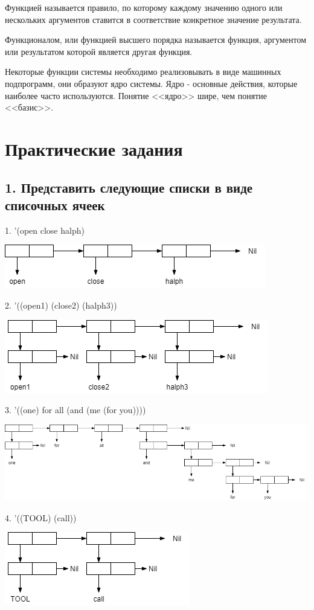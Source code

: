 \documentclass[12pt]{report}
\begin{document}
Функцией называется правило, по которому каждому значению одного или нескольких  аргументов ставится в соответствие конкретное значение результата.

Функционалом, или функцией высшего порядка называется функция, аргументом или  результатом которой является другая функция.

Некоторые функции системы необходимо реализовывать в виде машинных подпрограмм, они образуют ядро системы. Ядро - основные действия, которые наиболее часто используются. Понятие <<ядро>> шире, чем понятие <<базис>>.

	
\chapter*{Практические задания}	

\section*{1. Представить следующие списки в виде списочных ячеек}

1. '(open close halph)

\includegraphics[scale=1]{img/1.1}

2. '((open1) (close2) (halph3))

\includegraphics[scale=1]{img/1.2}

3. '((one) for all (and (me (for you))))

\includegraphics[scale=0.6]{img/1.3}

4. '((TOOL) (call))

\includegraphics[scale=1]{img/1.4}
\end{document}
